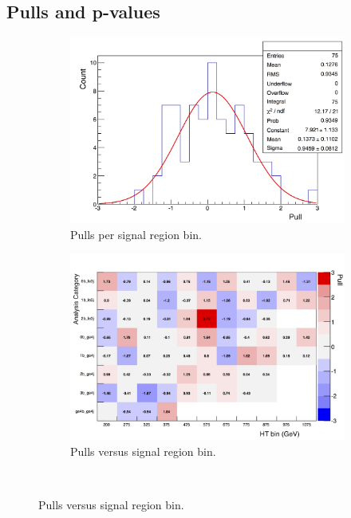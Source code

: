 \subsection{Pulls and p-values}

\begin{figure}[h!]
  \centering
  \begin{subfigure}[b]{0.46\textwidth}
    \includegraphics[width=\textwidth]{Figs/results/v0/pulls/pull_per_bin_img.png}
    \caption{Pulls per signal region bin.}
    \label{fig:pull_distro}
  \end{subfigure}
  \begin{subfigure}[b]{0.46\textwidth}
    \includegraphics[width=\textwidth]{Figs/results/v0/pulls/chris_latest2_2_img.png}
    \caption{Pulls versus signal region bin.}
    \label{fig:french_flag}
  \end{subfigure}\\

\end{figure}
